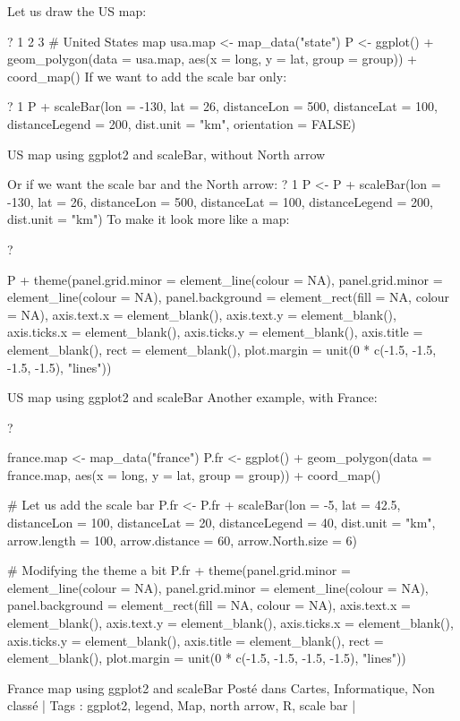 Let us draw the US map:

?
1
2
3
# United States map
usa.map <- map_data("state")
P <- ggplot() + geom_polygon(data = usa.map, aes(x = long, y = lat, group = group)) + coord_map()
If we want to add the scale bar only:

?
1
P + scaleBar(lon = -130, lat = 26, distanceLon = 500, distanceLat = 100, distanceLegend = 200, dist.unit = "km", orientation = FALSE)

US map using ggplot2 and scaleBar, without North arrow

Or if we want the scale bar and the North arrow:
?
1
P <- P + scaleBar(lon = -130, lat = 26, distanceLon = 500, distanceLat = 100, distanceLegend = 200, dist.unit = "km")
To make it look more like a map:

?

P + theme(panel.grid.minor = element_line(colour = NA), panel.grid.minor = element_line(colour = NA),
    panel.background = element_rect(fill = NA, colour = NA), axis.text.x = element_blank(),
    axis.text.y = element_blank(), axis.ticks.x = element_blank(),
    axis.ticks.y = element_blank(), axis.title = element_blank(),
    rect = element_blank(),
    plot.margin = unit(0 * c(-1.5, -1.5, -1.5, -1.5), "lines"))

US map using ggplot2 and scaleBar
Another example, with France:

?

france.map <- map_data("france")
P.fr <- ggplot() + geom_polygon(data = france.map, aes(x = long, y = lat, group = group)) + coord_map()
 
# Let us add the scale bar
P.fr <- P.fr + scaleBar(lon = -5, lat = 42.5, distanceLon = 100, distanceLat = 20, distanceLegend = 40, dist.unit = "km", arrow.length = 100, arrow.distance = 60, arrow.North.size = 6)
 
# Modifying the theme a bit
P.fr + theme(panel.grid.minor = element_line(colour = NA), panel.grid.minor = element_line(colour = NA),
    panel.background = element_rect(fill = NA, colour = NA), axis.text.x = element_blank(),
    axis.text.y = element_blank(), axis.ticks.x = element_blank(),
    axis.ticks.y = element_blank(), axis.title = element_blank(),
    rect = element_blank(),
    plot.margin = unit(0 * c(-1.5, -1.5, -1.5, -1.5), "lines"))

France map using ggplot2 and scaleBar
Posté dans Cartes, Informatique, Non classé	 | Tags : ggplot2, legend, Map, north arrow, R, scale bar	 |
